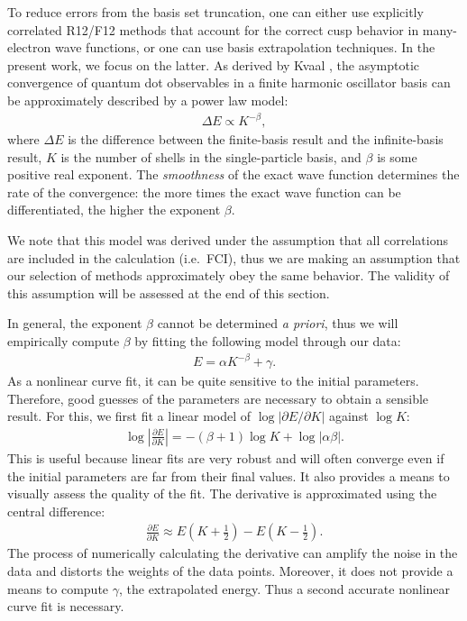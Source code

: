 \documentclass[aip, jcp, 12pt]{revtex4-1}
\begin{document}
To reduce errors from the basis set truncation, one can either use explicitly correlated R12/F12 methods that account for the correct cusp behavior in many-electron wave functions\cite{Kutzelnigg1985,KLOPPER198717,explicitcorrelationreview}, or one can use basis extrapolation techniques.  In the present work, we focus on the latter.  As derived by Kvaal \cite{PhysRevB.80.045321,Kvaal2007}, the asymptotic convergence of quantum dot observables in a finite harmonic oscillator basis can be approximately described by a power law model:
\begin{align*}
  \Delta E \propto K^{-\beta},
\end{align*}
where $\Delta E$ is the difference between the finite-basis result and the infinite-basis result, $K$ is the number of shells in the single-particle basis, and $\beta$ is some positive real exponent.  The \textit{smoothness} of the exact wave function determines the rate of the convergence: the more times the exact wave function can be differentiated, the higher the exponent $\beta$.

We note that this model was derived under the assumption that all correlations are included in the calculation (i.e.\ FCI), thus we are making an assumption that our selection of methods approximately obey the same behavior.  The validity of this assumption will be assessed at the end of this section.

In general, the exponent $\beta$ cannot be determined \textit{a priori}, thus we will empirically compute $\beta$ by fitting the following model through our data:
\begin{align} \label{eq:power_law_model}
  E = \alpha K^{-\beta} + \gamma.
\end{align}
As a nonlinear curve fit, it can be quite sensitive to the initial parameters.  Therefore, good guesses of the parameters are necessary to obtain a sensible result.  For this, we first fit a linear model of $\log |\partial E / \partial K|$ against $\log K$:
\begin{align*}
  \log \left|\frac{\partial E}{\partial K}\right| = - (\beta + 1) \log K + \log|\alpha \beta|.
\end{align*}
This is useful because linear fits are very robust and will often converge even if the initial parameters are far from their final values.  It also provides a means to visually assess the quality of the fit.  The derivative is approximated using the central difference:
\begin{align*}
  \frac{\partial E}{\partial K} \approx E\left(K + \frac{1}{2}\right) - E\left(K - \frac{1}{2}\right).
\end{align*}
The process of numerically calculating the derivative can amplify the noise in the data and distorts the weights of the data points.  Moreover, it does not provide a means to compute $\gamma$, the extrapolated energy.  Thus a second accurate nonlinear curve fit is necessary.
\end{document}
